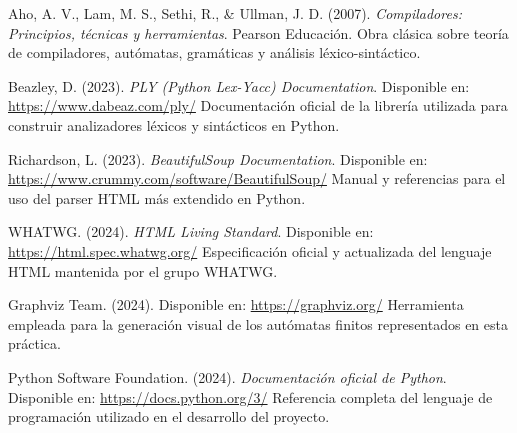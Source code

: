 \documentclass[11pt,a4paper]{article}
\begin{document}
\newpage
{}
\begin{thebibliography}{9}

Aho, A. V., Lam, M. S., Sethi, R., \& Ullman, J. D. (2007).  
\textit{Compiladores: Principios, técnicas y herramientas}.  
Pearson Educación. Obra clásica sobre teoría de compiladores, autómatas, gramáticas y análisis léxico-sintáctico.

Beazley, D. (2023).  
\textit{PLY (Python Lex-Yacc) Documentation}.  
Disponible en: \url{https://www.dabeaz.com/ply/}  
Documentación oficial de la librería utilizada para construir analizadores léxicos y sintácticos en Python.

Richardson, L. (2023).  
\textit{BeautifulSoup Documentation}.  
Disponible en: \url{https://www.crummy.com/software/BeautifulSoup/}  
Manual y referencias para el uso del parser HTML más extendido en Python.

WHATWG. (2024).  
\textit{HTML Living Standard}.  
Disponible en: \url{https://html.spec.whatwg.org/}  
Especificación oficial y actualizada del lenguaje HTML mantenida por el grupo WHATWG.

Graphviz Team. (2024).
Disponible en: \url{https://graphviz.org/}  
Herramienta empleada para la generación visual de los autómatas finitos representados en esta práctica.

Python Software Foundation. (2024).  
\textit{Documentación oficial de Python}.  
Disponible en: \url{https://docs.python.org/3/}  
Referencia completa del lenguaje de programación utilizado en el desarrollo del proyecto.

\end{thebibliography}
\end{document}
